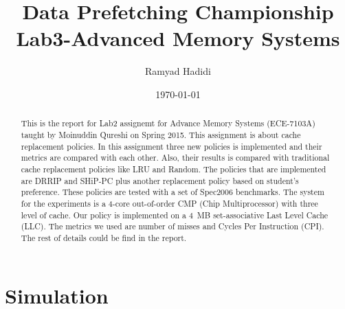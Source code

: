 \documentclass{article}
\title{Data Prefetching Championship\\
        \large{Lab3-Advanced Memory Systems}}
\author{Ramyad Hadidi}
\date{\today}
\begin{document}
\maketitle

\begin{abstract}
This is the report for Lab2 assignemt for Advance Memory Systems (ECE-7103A) taught by Moinuddin Qureshi on Spring 2015. This assignment is about cache replacement policies. In this assignment three new policies is implemented and their metrics are compared with each other. Also, their results is compared with traditional cache replacement policies like LRU and Random. The policies that are implemented are DRRIP\cite{rrip} and SHiP-PC\cite{ship} plus another replacement policy based on student's preference. These policies are tested with a set of Spec2006 benchmarks. The system for the experiments is a 4-core out-of-order CMP (Chip Multiprocessor) with three level of cache. Our policy is implemented on a 4~MB set-associative Last Level Cache (LLC). The metrics we used are number of misses and Cycles Per Instruction (CPI). The rest of details could be find in the report.
\end{abstract}

\section{Simulation}


% 


% 
% 
% 
\end{document}
